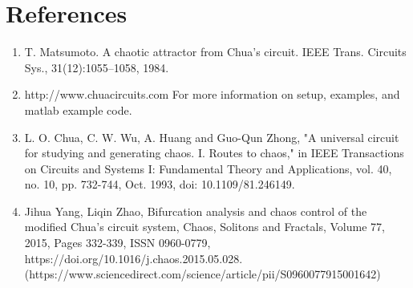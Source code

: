 \documentclass[12pt]{article}
\begin{document}
\section{References}
    \begin{enumerate}
        \sloppy

        \item  T. Matsumoto. A chaotic attractor from Chua’s circuit. IEEE Trans. Circuits Sys., 31(12):1055–1058, 1984.
        \item  http://www.chuacircuits.com For more information on setup, examples, and matlab example code.
        \item L. O. Chua, C. W. Wu, A. Huang and Guo-Qun Zhong, "A universal circuit for studying and generating chaos. I. Routes to chaos," in IEEE Transactions on Circuits and Systems I: Fundamental Theory and Applications, vol. 40, no. 10, pp. 732-744, Oct. 1993, doi: 10.1109/81.246149.
        \item Jihua Yang, Liqin Zhao,
        Bifurcation analysis and chaos control of the modified Chua’s circuit system,
        Chaos, Solitons and Fractals,
        Volume 77,
        2015,
        Pages 332-339,
        ISSN 0960-0779,
        https://doi.org/10.1016/j.chaos.2015.05.028.
        (https://www.sciencedirect.com/science/article/pii/S0960077915001642)

        

    \end{enumerate}
\end{document}
